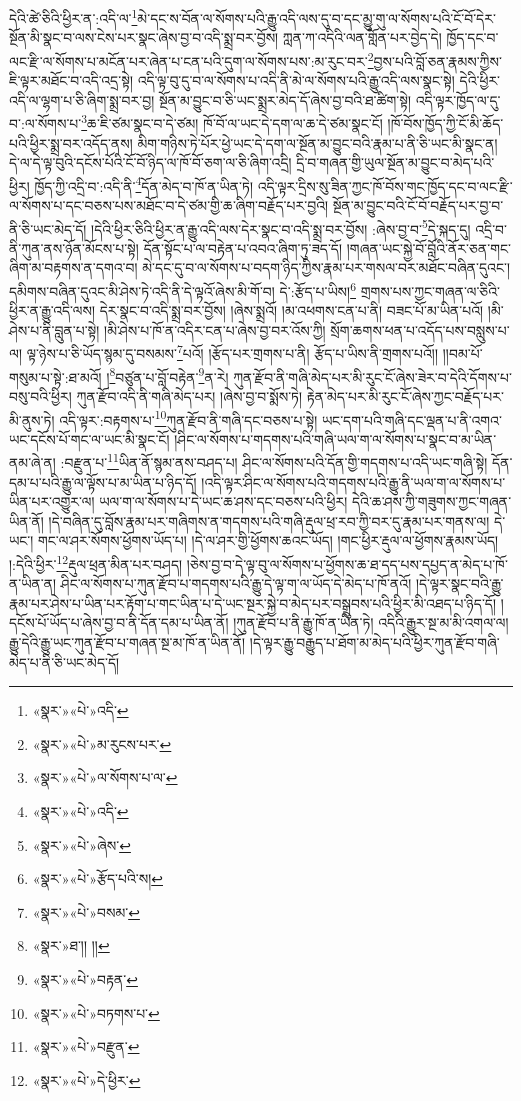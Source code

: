 དེའི་ཚེ་ཅིའི་ཕྱིར་ན་:འདི་ལ་\footnote{«སྣར་»«པེ་»འདི་}མེ་དང་ས་བོན་ལ་སོགས་པའི་རྒྱུ་འདི་ལས་དུ་བ་དང་མྱུ་གུ་ལ་སོགས་པའི་ངོ་བོ་དེར་སྔོན་མི་སྣང་བ་ལས་ངེས་པར་སྣང་ཞེས་བྱ་བ་འདི་སྨྲ་བར་བྱོས། ཀླན་ཀ་འདིའི་ལན་གློན་པར་བྱེད་དེ། ཁྱོད་དང་བ་ལང་རྫི་ལ་སོགས་པ་མངོན་པར་ཞེན་པ་ངན་པའི་དུག་ལ་སོགས་པས་:མ་རུང་བར་\footnote{«སྣར་»«པེ་»མ་རུངས་པར་}བྱས་པའི་བློ་ཅན་རྣམས་ཀྱིས་ཇི་ལྟར་མཐོང་བ་འདི་འདྲ་སྟེ། འདི་ལྟ་བུ་དུ་བ་ལ་སོགས་པ་འདི་ནི་མེ་ལ་སོགས་པའི་རྒྱུ་འདི་ལས་སྣང་སྟེ། དེའི་ཕྱིར་འདི་ལ་ལྷག་པ་ཅི་ཞིག་སྨྲ་བར་བྱ། སྔོན་མ་བྱུང་བ་ཅི་ཡང་སྨྲར་མེད་དོ་ཞེས་བྱ་བའི་ཐ་ཚིག་སྟེ། འདི་ལྟར་ཁྱོད་ལ་དུ་བ་:ལ་སོགས་པ་\footnote{«སྣར་»«པེ་»ལ་སོགས་པ་ལ་}ཆ་ཇི་ཙམ་སྣང་བ་དེ་ཙམ། ཁོ་བོ་ལ་ཡང་དེ་དག་ལ་ཆ་དེ་ཙམ་སྣང་ངོ། །ཁོ་བོས་ཁྱོད་ཀྱི་ངོ་མི་ཆོད་པའི་ཕྱིར་སྨྲ་བར་འདོད་ནས། མིག་གཉིས་ཏེ་པོར་ཕྱེ་ཡང་དེ་དག་ལ་སྔོན་མ་བྱུང་བའི་རྣམ་པ་ནི་ཅི་ཡང་མི་སྣང་ན། དེ་ལ་དེ་ལྟ་བུའི་དངོས་པོའི་ངོ་བོ་ཉིད་ལ་ཁོ་བོ་ཅག་ལ་ཅི་ཞིག་འདྲི། དྲི་བ་གཞན་གྱི་ཡུལ་སྔོན་མ་བྱུང་བ་མེད་པའི་ཕྱིར། ཁྱོད་ཀྱི་འདྲི་བ་:འདི་ནི་\footnote{«སྣར་»«པེ་»འདི་}དོན་མེད་བ་ཁོ་ན་ཡིན་ཏེ། འདི་ལྟར་དྲིས་སུ་ཟིན་ཀྱང་ཁོ་བོས་གང་ཁྱོད་དང་བ་ལང་རྫི་ལ་སོགས་པ་དང་བཅས་པས་མཐོང་བ་དེ་ཙམ་གྱི་ཆ་ཞིག་བརྗོད་པར་བྱའི། སྔོན་མ་བྱུང་བའི་ངོ་བོ་བརྗོད་པར་བྱ་བ་ནི་ཅི་ཡང་མེད་དོ། །དེའི་ཕྱིར་ཅིའི་ཕྱིར་ན་རྒྱུ་འདི་ལས་དེར་སྣང་བ་འདི་སྨྲ་བར་བྱོས། :ཞེས་བྱ་བ་\footnote{«སྣར་»«པེ་»ཞེས་}དེ་སྐད་དུ། འདྲི་བ་ནི་ཀུན་ནས་ཉོན་མོངས་པ་སྟེ། དོན་སྟོང་པ་ལ་བརྟེན་པ་འབའ་ཞིག་ཏུ་ཟད་དོ། །གཞན་ཡང་སྐྱེ་བོ་བློའི་ནོར་ཅན་གང་ཞིག་མ་བརྟགས་ན་དགའ་བ། མེ་དང་དུ་བ་ལ་སོགས་པ་བདག་ཉིད་ཀྱིས་རྣམ་པར་གསལ་བར་མཐོང་བཞིན་དུའང་། དམིགས་བཞིན་དུའང་མི་ཤེས་ཏེ་འདི་ནི་དེ་ལྟའོ་ཞེས་མི་གོ་བ། དེ་:རྩོད་པ་ཡིས།\footnote{«སྣར་»«པེ་»རྩོད་པའི་ས།} གྲགས་པས་ཀྱང་གཞན་ལ་ཅིའི་ཕྱིར་ན་རྒྱུ་འདི་ལས། དེར་སྣང་བ་འདི་སྨྲ་བར་བྱོས། །ཞེས་སྨྲའོ། །མ་འཕགས་ངན་པ་ནི། བཟང་པོ་མ་ཡིན་པའོ། །མི་ཤེས་པ་ནི་བླུན་པ་སྟེ། །མི་ཤེས་པ་ཁོ་ན་འདིར་ངན་པ་ཞེས་བྱ་བར་འོས་ཀྱི། སྲོག་ཆགས་ཕན་པ་འདོད་པས་བསླུས་པ་ལ། ལྟ་ཉེས་པ་ཅི་ཡོད་སྙམ་དུ་བསམས་\footnote{«སྣར་»«པེ་»བསམ་}པའོ། །རྩོད་པར་གྲགས་པ་ནི། རྩོད་པ་ཡིས་ནི་གྲགས་པའོ།། །།བམ་པོ་གསུམ་པ་སྟེ་:ཐ་མའོ། །\footnote{«སྣར་»ཐ་།། །།}བཙུན་པ་བློ་བརྟེན་\footnote{«སྣར་»«པེ་»བརྟན་}ན་རེ། ཀུན་རྫོབ་ནི་གཞི་མེད་པར་མི་རུང་ངོ་ཞེས་ཟེར་བ་དེའི་དོགས་པ་བསུ་བའི་ཕྱིར། ཀུན་རྫོབ་འདི་ནི་གཞི་མེད་པར། །ཞེས་བྱ་བ་སྨོས་ཏེ། རྟེན་མེད་པར་མི་རུང་ངོ་ཞེས་ཀྱང་བརྗོད་པར་མི་ནུས་ཏེ། འདི་ལྟར་:བརྟགས་པ་\footnote{«སྣར་»«པེ་»བཏགས་པ་}ཀུན་རྫོབ་ནི་གཞི་དང་བཅས་པ་སྟེ། ཡང་དག་པའི་གཞི་དང་ལྡན་པ་ནི་འགའ་ཡང་དངོས་པོ་གང་ལ་ཡང་མི་སྣང་ངོ། །ཤིང་ལ་སོགས་པ་གདགས་པའི་གཞི་ཡལ་ག་ལ་སོགས་པ་སྣང་བ་མ་ཡིན་ནམ་ཞེ་ན། :བརྫུན་པ་\footnote{«སྣར་»«པེ་»བརྫུན་}ཡིན་ནོ་སྙམ་ནས་བཤད་པ། ཤིང་ལ་སོགས་པའི་དོན་གྱི་གདགས་པ་འདི་ཡང་གཞི་སྟེ། དོན་དམ་པ་པའི་རྒྱུ་ལ་ལྟོས་པ་མ་ཡིན་པ་ཉིད་དོ། །འདི་ལྟར་ཤིང་ལ་སོགས་པའི་གདགས་པའི་རྒྱུ་ནི་ཡལ་ག་ལ་སོགས་པ་ཡིན་པར་འགྱུར་ལ། ཡལ་ག་ལ་སོགས་པ་དེ་ཡང་ཆ་ཤས་དང་བཅས་པའི་ཕྱིར། དེའི་ཆ་ཤས་ཀྱི་གཟུགས་ཀྱང་གཞན་ཡིན་ནོ། །དེ་བཞིན་དུ་བློས་རྣམ་པར་གཞིགས་ན་གདགས་པའི་གཞི་རྡུལ་ཕྲ་རབ་ཀྱི་བར་དུ་རྣམ་པར་གནས་ལ། དེ་ཡང་། གང་ལ་ཤར་སོགས་ཕྱོགས་ཡོད་པ། །དེ་ལ་ཤར་གྱི་ཕྱོགས་ཆའང་ཡོད། །གང་ཕྱིར་རྡུལ་ལ་ཕྱོགས་རྣམས་ཡོད། །:དེའི་ཕྱིར་\footnote{«སྣར་»«པེ་»དེ་ཕྱིར་}རྡུལ་ཕྲན་མིན་པར་བཤད། །ཅེས་བྱ་བ་དེ་ལྟ་བུ་ལ་སོགས་པ་ཕྱོགས་ཆ་ཐ་དད་པས་དཔྱད་ན་མེད་པ་ཁོ་ན་ཡིན་ན། ཤིང་ལ་སོགས་པ་ཀུན་རྫོབ་པ་གདགས་པའི་རྒྱུ་དེ་ལྟ་ག་ལ་ཡོད་དེ་མེད་པ་ཁོ་ནའོ། །དེ་ལྟར་སྣང་བའི་རྒྱུ་རྣམ་པར་ཤེས་པ་ཡིན་པར་རྟོག་པ་གང་ཡིན་པ་དེ་ཡང་སྔར་སྐྱེ་བ་མེད་པར་བསྒྲུབས་པའི་ཕྱིར་མི་འཐད་པ་ཉིད་དོ། །དངོས་པོ་ཡོད་པ་ཞེས་བྱ་བ་ནི་དོན་དམ་པ་ཡིན་ནོ། །ཀུན་རྫོབ་པ་ནི་རྒྱུ་ཁོ་ན་ཡིན་ཏེ། འདིའི་རྒྱུར་སྔ་མ་མི་འགལ་ལ། རྒྱུ་དེའི་རྒྱུ་ཡང་ཀུན་རྫོབ་པ་གཞན་སྔ་མ་ཁོ་ན་ཡིན་ནོ། །དེ་ལྟར་རྒྱུ་བརྒྱུད་པ་ཐོག་མ་མེད་པའི་ཕྱིར་ཀུན་རྫོབ་གཞི་མེད་པ་ནི་ཅི་ཡང་མེད་དོ། 